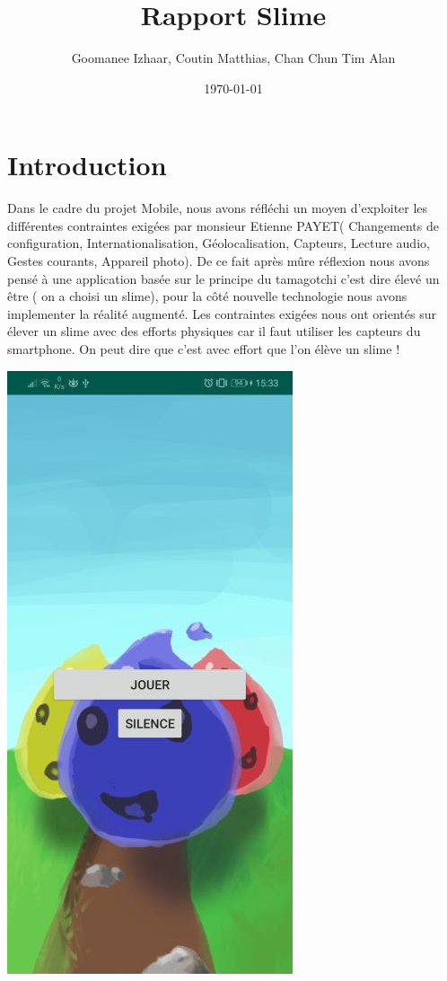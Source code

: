 \documentclass{article}
\title{Rapport Slime}
\author{Goomanee Izhaar, Coutin Matthias, Chan Chun Tim Alan}
\date{\today}
\begin{document}
\maketitle %


\begin{abstract}

\end{abstract}

\section{Introduction}
\label{section:hello} %

Dans le cadre du projet Mobile, nous avons réfléchi un moyen d’exploiter les différentes contraintes exigées par monsieur Etienne PAYET( Changements de configuration, Internationalisation, Géolocalisation, Capteurs, Lecture audio, Gestes courants, Appareil photo). De ce fait après mûre réflexion nous avons pensé à une application basée sur le principe du tamagotchi c’est dire élevé un être ( on a choisi un slime), pour la côté nouvelle technologie nous avons implementer la réalité augmenté. Les contraintes exigées nous ont orientés sur élever un slime avec des efforts physiques car il faut utiliser les capteurs du smartphone. On peut dire que c’est avec effort que l’on élève un slime !

\begin{center}
  \includegraphics[scale=0.4]{Main.jpg}
\end{center}
\newpage
\end{document}
